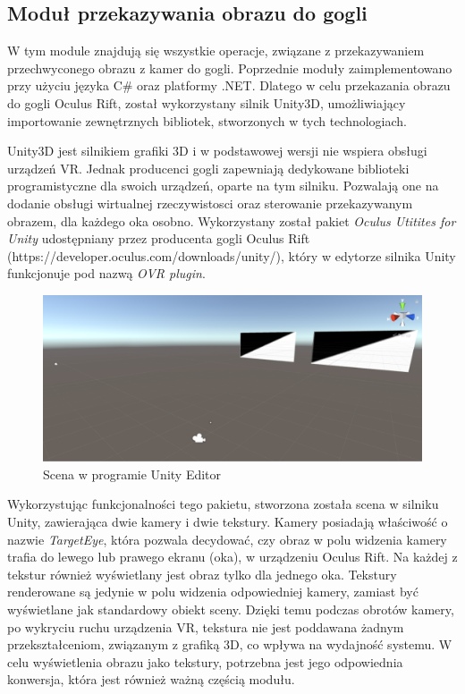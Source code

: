 \documentclass[a4paper,11pt,twoside]{report}
\theoremstyle{definition}
\begin{document}
\subsection{Moduł przekazywania obrazu do gogli}

W tym module znajdują się wszystkie operacje, związane z przekazywaniem przechwyconego obrazu z kamer do gogli. Poprzednie moduły zaimplementowano przy użyciu języka C\# oraz  platformy .NET. Dlatego w celu przekazania obrazu do gogli Oculus Rift, został wykorzystany silnik Unity3D, umożliwiający importowanie zewnętrznych bibliotek, stworzonych w tych technologiach.

Unity3D jest silnikiem grafiki 3D i w podstawowej wersji nie wspiera obsługi urządzeń VR. Jednak producenci gogli zapewniają dedykowane biblioteki programistyczne dla swoich urządzeń, oparte na tym silniku. Pozwalają one na dodanie obsługi wirtualnej rzeczywistosci oraz sterowanie przekazywanym obrazem, dla każdego oka osobno. Wykorzystany został pakiet \textit{Oculus Utitites for Unity} udostępniany przez producenta gogli Oculus Rift (https://developer.oculus.com/downloads/unity/), który w  edytorze silnika Unity funkcjonuje pod nazwą \textit{OVR plugin}.  \hfill \\

\begin{figure}[H]
\centering
\includegraphics[scale=0.5]{images/unityscene}
\caption[Scena Unity]{Scena w programie Unity Editor}
\end{figure}

Wykorzystując funkcjonalności tego pakietu, stworzona została scena w silniku Unity, zawierająca dwie kamery i dwie tekstury. Kamery posiadają właściwość o nazwie \textit{TargetEye}, która pozwala decydować, czy obraz w polu widzenia kamery trafia do lewego lub prawego ekranu (oka), w urządzeniu Oculus Rift. Na każdej z tekstur również wyświetlany jest obraz tylko dla jednego oka. Tekstury renderowane są jedynie w polu widzenia odpowiedniej kamery, zamiast być wyświetlane jak standardowy obiekt sceny. Dzięki temu podczas obrotów kamery, po wykryciu ruchu urządzenia VR, tekstura nie jest poddawana żadnym przekształceniom, związanym z grafiką 3D, co wpływa na wydajność systemu. W celu wyświetlenia obrazu jako tekstury, potrzebna jest jego odpowiednia konwersja, która jest również ważną częścią modułu.
\end{document}
